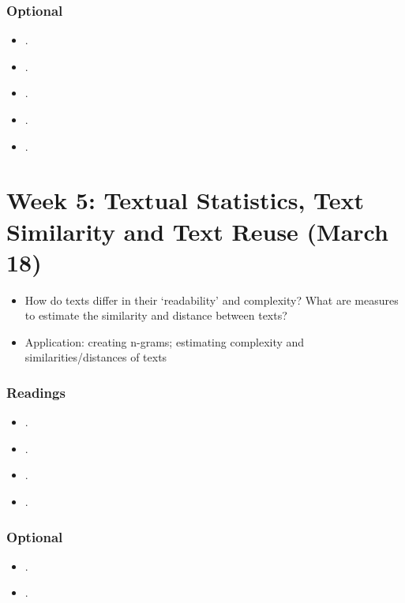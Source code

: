 \documentclass[abstract=on,parskip=full,headings=standardclasses,fontsize=11pt,paper=a4]{scrartcl}
\begin{document}
\subsubsection*{Optional}
\begin{itemize}
\item {}.
\item {}.
\item {}.
\item {}.
\item {}.
\end{itemize}

\section{Week 5: Textual Statistics, Text Similarity and Text Reuse (March 18)}

\begin{itemize}
\item How do texts differ in their `readability' and complexity? What are measures to estimate the similarity and distance between texts?
\item Application: creating n-grams; estimating complexity and similarities/distances of texts
\end{itemize}

\subsubsection*{Readings}
\begin{itemize}
\item {}.
\item {}.
\item {}.
\item {}.
\end{itemize}

\subsubsection*{Optional}
\begin{itemize}
\item {}.
\item {}.
\end{itemize}
\end{document}
